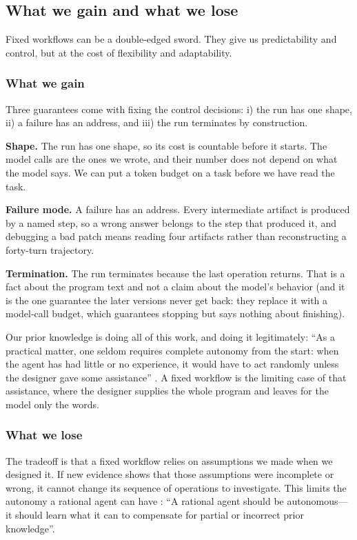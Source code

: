 \subsection{What we gain and what we lose}
\label{sec:fixed-tradeoff}

Fixed workflows can be a double-edged sword. They give us predictability and control, but at the cost of flexibility and adaptability.

\subsubsection{What we gain}
Three guarantees come with fixing the control decisions: i) the run has one shape, ii) a failure
has an address, and iii) the run terminates by construction. 
\bi

\item \textbf{Shape.} The run has one shape, so its cost is countable before it starts. The model calls are the ones we wrote, and their number does not depend on what the model says. We can put a token budget on a task
before we have read the task.

\item \textbf{Failure mode.} A failure has an address. Every intermediate artifact is produced by a named step, so a wrong
answer belongs to the step that produced it, and debugging a bad patch means reading four
artifacts rather than reconstructing a forty-turn trajectory.

\item \textbf{Termination.} The run terminates because the last operation returns. That is a fact about the program text and
not a claim about the model's behavior (and it is the one guarantee the later versions never get
back: they replace it with a model-call budget, which guarantees stopping but says nothing about
finishing).

\ei

Our prior knowledge is doing all of this work, and doing it legitimately: ``As a practical matter,
one seldom requires complete autonomy from the start: when the agent has had little or no
experience, it would have to act randomly unless the designer gave some assistance''
\citep[\S2.2.3]{russell2020aima}. A fixed workflow is the limiting case of that assistance, where
the designer supplies the whole program and leaves for the model only the words.

\subsubsection{What we lose}
The tradeoff is that a fixed workflow relies on assumptions we made when we designed it.
If new evidence shows that those assumptions were incomplete or wrong, it cannot change its
sequence of operations to investigate. This limits the autonomy a rational agent can have \citep[\S2.2.3]{russell2020aima}:
``A rational agent should be autonomous---it should learn what it can to compensate for partial or incorrect prior knowledge''.

